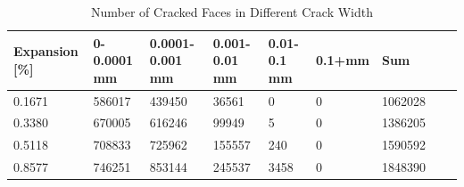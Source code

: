 
\begin{table}[ht!]
  \caption{Number of Cracked Faces in Different Crack Width}
    \centering
    \begin{tabular}{| p{2.0cm} | p{1.6cm} | p{1.6cm} | p{1.6cm} | p{1.6cm} | p{1.6cm} | p{1.6cm} | p{1.6cm} | p{2.0cm} | }
    \hline

	Expansion [\%] & 0-0.0001 mm & 0.0001-0.001 mm & 0.001-0.01 mm & 0.01-0.1 mm & 0.1+mm & Sum \\ \hline

    0.1671 &	586017 &	439450 &	36561 &	0 &	0 &	1062028\\ \hline
    0.3380 &	670005 &	616246 &	99949 &	5 &	0 &	1386205\\ \hline
    0.5118 &	708833 &	725962 &	155557 &	240 &	0 &	1590592\\ \hline
    0.8577 &	746251 &	853144 &	245537 &	3458 &	0 &	1848390\\ \hline

    \end{tabular}

    \label{}
\end{table}


